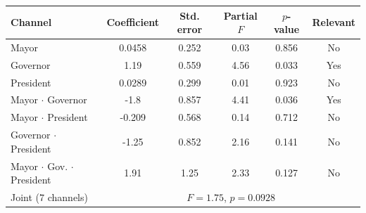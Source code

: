 \begin{tabular}{@{}lccccc@{}}
\toprule
Channel & Coefficient & Std. error & Partial $F$ & $p$-value & Relevant \\
\midrule
Mayor & 0.0458 & 0.252 & 0.03 & 0.856 & No \\
Governor & 1.19 & 0.559 & 4.56 & 0.033 & Yes \\
President & 0.0289 & 0.299 & 0.01 & 0.923 & No \\
Mayor $\cdot$ Governor & -1.8 & 0.857 & 4.41 & 0.036 & Yes \\
Mayor $\cdot$ President & -0.209 & 0.568 & 0.14 & 0.712 & No \\
Governor $\cdot$ President & -1.25 & 0.852 & 2.16 & 0.141 & No \\
Mayor $\cdot$ Gov. $\cdot$ President & 1.91 & 1.25 & 2.33 & 0.127 & No \\
\midrule
Joint ($7$ channels) & \multicolumn{5}{c}{$F=1.75$, $p=0.0928$} \\
\bottomrule
\end{tabular}
